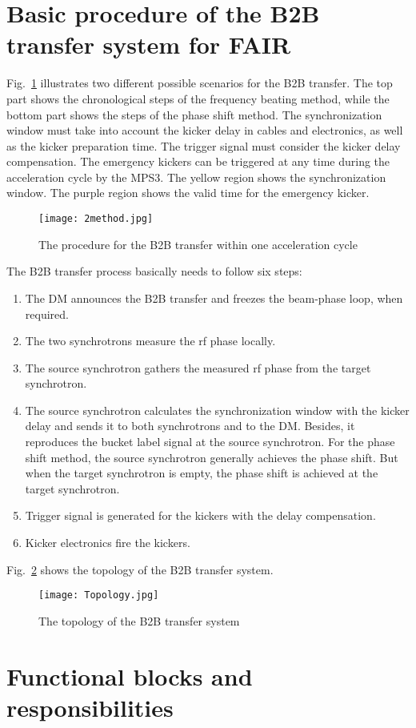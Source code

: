 \section{Basic procedure of the B2B transfer system for FAIR}
 Fig.~\ref{2method} illustrates two different possible scenarios for the B2B transfer. The top part shows the chronological steps of the frequency beating method, while the bottom part shows the steps of the phase shift method. The synchronization window must take into account the kicker delay in cables and electronics, as well as the kicker preparation time. The trigger signal must consider the kicker delay compensation.
The emergency kickers can be triggered at any time during the acceleration cycle by the MPS3. The yellow region shows the synchronization window. The purple region shows the valid time for the emergency kicker. 
\begin{figure}[!htb]
   \centering   
   \texttt{[image: 2method.jpg]}
   \caption{The procedure for the B2B transfer within one acceleration cycle}
   \label{2method}
\end{figure}
The B2B transfer process basically needs to follow six steps:
\begin{enumerate}
\item The DM announces the B2B transfer and freezes the beam-phase loop, when required.
\item The two synchrotrons measure the rf phase locally.
\item The source synchrotron gathers the measured rf phase from the target synchrotron.
\item The source synchrotron calculates the synchronization window with the kicker delay and sends it to both synchrotrons and to the DM. Besides, it reproduces the bucket label signal at the source synchrotron.
For the phase shift method, the source synchrotron generally achieves the phase shift. But when the target synchrotron is empty, the phase shift is achieved at the target synchrotron.
\item Trigger signal is generated for the kickers with the delay compensation.
\item Kicker electronics fire the kickers.
\end{enumerate}
Fig.~\ref{Topology} shows the topology of the B2B transfer system.
\begin{figure}[!htb]
   \centering   
   \texttt{[image: Topology.jpg]}
   \caption{The topology of the B2B transfer system}
   \label{Topology}
\end{figure}

\section{Functional blocks and responsibilities}


